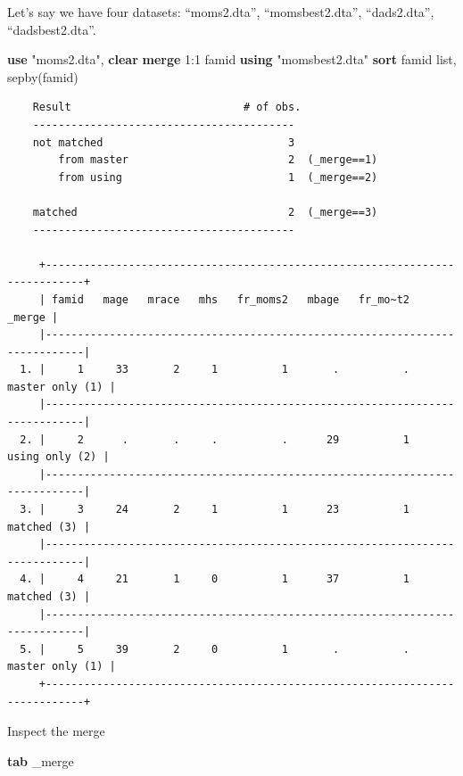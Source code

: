 \documentclass[
]{book}
\newenvironment{Shaded}{\begin{snugshade}}{\end{snugshade}}
\newcommand{\DataTypeTok}[1]{\textcolor[rgb]{0.13,0.29,0.53}{#1}}
\newcommand{\KeywordTok}[1]{\textcolor[rgb]{0.13,0.29,0.53}{\textbf{#1}}}
\newcommand{\NormalTok}[1]{#1}
\newcommand{\OtherTok}[1]{\textcolor[rgb]{0.56,0.35,0.01}{#1}}
\newcommand{\StringTok}[1]{\textcolor[rgb]{0.31,0.60,0.02}{#1}}
\begin{document}
Let's say we have four datasets: ``moms2.dta'', ``momsbest2.dta'', ``dads2.dta'', ``dadsbest2.dta''.

\begin{Shaded}
\begin{Highlighting}[]
\KeywordTok{use} \StringTok{"moms2.dta"}\NormalTok{, }\KeywordTok{clear}
\KeywordTok{merge}\NormalTok{ 1:1 famid }\KeywordTok{using} \StringTok{"momsbest2.dta"}
\KeywordTok{sort}\NormalTok{ famid}
\OtherTok{list}\NormalTok{, sepby(famid)}
\end{Highlighting}
\end{Shaded}

\begin{verbatim}
    Result                           # of obs.
    -----------------------------------------
    not matched                             3
        from master                         2  (_merge==1)
        from using                          1  (_merge==2)

    matched                                 2  (_merge==3)
    -----------------------------------------

     +----------------------------------------------------------------------------+
     | famid   mage   mrace   mhs   fr_moms2   mbage   fr_mo~t2            _merge |
     |----------------------------------------------------------------------------|
  1. |     1     33       2     1          1       .          .   master only (1) |
     |----------------------------------------------------------------------------|
  2. |     2      .       .     .          .      29          1    using only (2) |
     |----------------------------------------------------------------------------|
  3. |     3     24       2     1          1      23          1       matched (3) |
     |----------------------------------------------------------------------------|
  4. |     4     21       1     0          1      37          1       matched (3) |
     |----------------------------------------------------------------------------|
  5. |     5     39       2     0          1       .          .   master only (1) |
     +----------------------------------------------------------------------------+
\end{verbatim}

Inspect the merge

\begin{Shaded}
\begin{Highlighting}[]
\KeywordTok{tab} \DataTypeTok{\_merge} 
\end{Highlighting}
\end{Shaded}
\end{document}
